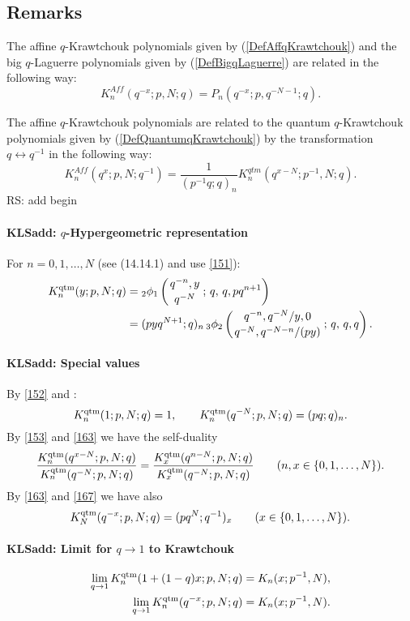 \documentclass[envcountchap,graybox]{svmono}
\newcommand{\qhyp}[5]{\mbox{}_{#1}{\phi}_{#2}
\left(\genfrac{}{}{0pt}{}{#3}{#4}\,;\,q,\,#5\right)}
\newcommand{\qhyp}[5]{\,\mbox{}_{#1}\phi_{#2}\!\left(
  \genfrac{}{}{0pt}{}{#3}{#4};#5\right)}
\begin{document}
\subsection*{Remarks}
The affine $q$-Krawtchouk polynomials given by (\ref{DefAffqKrawtchouk})
and the big $q$-Laguerre polynomials given by (\ref{DefBigqLaguerre}) are
related in the following way:
$$K_n^{Aff}(q^{-x};p,N;q)=P_n(q^{-x};p,q^{-N-1};q).$$

\noindent
The affine $q$-Krawtchouk polynomials are related to the quantum
$q$-Krawtchouk polynomials given by (\ref{DefQuantumqKrawtchouk})
by the transformation $q\leftrightarrow q^{-1}$ in the following way:
$$K_n^{Aff}(q^x;p,N;q^{-1})=\frac{1}{(p^{-1}q;q)_n}
K_n^{qtm}(q^{x-N};p^{-1},N;q).$$
 RS: add begin\label{sec14.14}
%
\paragraph{\large\bf KLSadd: $q$-Hypergeometric representation}For $n=0,1,\ldots,N$
(see (14.14.1) and use \eqref{151}):
\begin{align}
K_n^{\rm qtm}(y;p,N;q)
&=\qhyp21{q^{-n},y}{q^{-N}}{q,pq^{n+1}}
\label{152}\\
&=(pyq^{N+1};q)_n\,
\qhyp32{q^{-n},q^{-N}/y,0}{q^{-N},q^{-N-n}/(py)}{q,q}.
\label{153}
\end{align}
%
\paragraph{\large\bf KLSadd: Special values}By \eqref{152} and :
\begin{equation}
K_n^{\rm qtm}(1;p,N;q)=1,\qquad
K_n^{\rm qtm}(q^{-N};p,N;q)=(pq;q)_n.
\label{163}
\end{equation}
By \eqref{153} and \eqref{163} we have the self-duality
\begin{equation}
\frac{K_n^{\rm qtm}(q^{x-N};p,N;q)}{K_n^{\rm qtm}(q^{-N};p,N;q)}
=\frac{K_x^{\rm qtm}(q^{n-N};p,N;q)}{K_x^{\rm qtm}(q^{-N};p,N;q)}\qquad
(n,x\in\{0,1,\ldots,N\}).
\label{167}
\end{equation}
By \eqref{163} and \eqref{167} we have also
\begin{equation}
K_N^{\rm qtm}(q^{-x};p,N;q)=(pq^N;q^{-1})_x\qquad(x\in\{0,1,\ldots,N\}).
\label{169}
\end{equation}
%
\paragraph{\large\bf KLSadd: Limit for $q\to1$ to Krawtchouk}\begin{align}
\lim_{q\to1} K_n^{\rm qtm}(1+(1-q)x;p,N;q)&=K_n(x;p^{-1},N),
\label{161}\\
\lim_{q\to1} K_n^{\rm qtm}(q^{-x};p,N;q)&=K_n(x;p^{-1},N).
\label{164}
\end{align}
%
\end{document}
